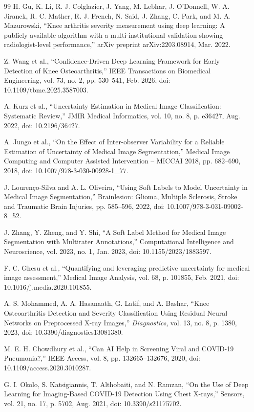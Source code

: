 \documentclass[runningheads]{llncs}
\begin{document}
\begin{thebibliography}{99}
 H. Gu, K. Li, R. J. Colglazier, J. Yang, M. Lebhar, J. O’Donnell, W. A. Jiranek, R. C. Mather, R. J. French, N. Said, J. Zhang, C. Park, and M. A. Mazurowski, “Knee arthritis severity measurement using deep learning: A publicly available algorithm with a multi-institutional validation showing radiologist-level performance,” arXiv preprint arXiv:2203.08914, Mar. 2022.

 Z. Wang et al., “Confidence-Driven Deep Learning Framework for Early Detection of Knee Osteoarthritis,” IEEE Transactions on Biomedical Engineering, vol. 73, no. 2, pp. 530–541, Feb. 2026, doi: 10.1109/tbme.2025.3587003.

 A. Kurz et al., “Uncertainty Estimation in Medical Image Classification: Systematic Review,” JMIR Medical Informatics, vol. 10, no. 8, p. e36427, Aug. 2022, doi: 10.2196/36427.

 A. Jungo et al., “On the Effect of Inter-observer Variability for a Reliable Estimation of Uncertainty of Medical Image Segmentation,” Medical Image Computing and Computer Assisted Intervention – MICCAI 2018, pp. 682–690, 2018, doi: 10.1007/978-3-030-00928-1\_77.

 J. Lourenço-Silva and A. L. Oliveira, “Using Soft Labels to Model Uncertainty in Medical Image Segmentation,” Brainlesion: Glioma, Multiple Sclerosis, Stroke and Traumatic Brain Injuries, pp. 585–596, 2022, doi: 10.1007/978-3-031-09002-8\_52.

 J. Zhang, Y. Zheng, and Y. Shi, “A Soft Label Method for Medical Image Segmentation with Multirater Annotations,” Computational Intelligence and Neuroscience, vol. 2023, no. 1, Jan. 2023, doi: 10.1155/2023/1883597.

 F. C. Ghesu et al., “Quantifying and leveraging predictive uncertainty for medical image assessment,” Medical Image Analysis, vol. 68, p. 101855, Feb. 2021, doi: 10.1016/j.media.2020.101855.

 A. S. Mohammed, A. A. Hasanaath, G. Latif, and A. Bashar, “Knee Osteoarthritis Detection and Severity Classification Using Residual Neural Networks on Preprocessed X-ray Images,” \textit{Diagnostics}, vol. 13, no. 8, p. 1380, 2023, doi: 10.3390/diagnostics13081380.

 M. E. H. Chowdhury et al., “Can AI Help in Screening Viral and COVID-19 Pneumonia?,” IEEE Access, vol. 8, pp. 132665–132676, 2020, doi: 10.1109/access.2020.3010287.

 G. I. Okolo, S. Katsigiannis, T. Althobaiti, and N. Ramzan, “On the Use of Deep Learning for Imaging-Based COVID-19 Detection Using Chest X-rays,” Sensors, vol. 21, no. 17, p. 5702, Aug. 2021, doi: 10.3390/s21175702.


\end{thebibliography}
\end{document}
